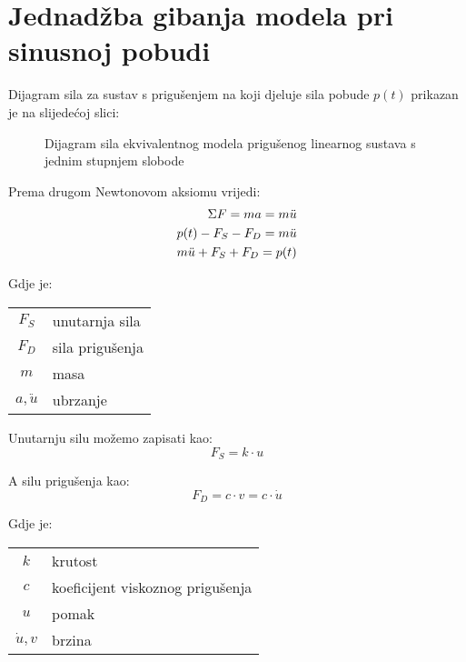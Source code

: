 \section{Jednadžba gibanja modela pri sinusnoj pobudi}
Dijagram sila za sustav s prigušenjem na koji djeluje sila pobude $p(t)$ prikazan je
na slijedećoj slici:

\begin{figure}[H]
    
    \label{fig:sile-priguseni-ekvivalentni-sustav-sdf}
    \caption{Dijagram sila ekvivalentnog modela prigušenog linearnog sustava s jednim stupnjem slobode}
\end{figure}

Prema drugom Newtonovom aksiomu vrijedi:
\begin{align}
    \Sigma F = ma = m\ddot{u}\notag\\
        p(t) - F_S - F_D = m\ddot{u} \notag\\
        m\ddot{u} + F_S + F_D = p(t) \label{eq:newton}
\end{align}

Gdje je:\\
\begin{table}[H]
\begin{tabular}{c l}
	$F_S$ & unutarnja sila \\
	$F_D$ & sila prigušenja \\
	$m$   & masa \\
        $a,\ddot{u}$   & ubrzanje\\
\end{tabular}
\end{table}

Unutarnju silu možemo zapisati kao:
\begin{equation}
	F_S = k \cdot u \label{eq:hooke}
\end{equation}

A silu prigušenja kao:
\begin{equation}
	F_D = c \cdot v = c \cdot \dot{u} \label{eq:prigusenje}
\end{equation}

Gdje je:\\
\begin{table}[H]
\begin{tabular}{c l}
	$k$ & krutost \\
	$c$ & koeficijent viskoznog prigušenja \\
	$u$ & pomak \\
	$\dot{u},v$ & brzina \\
\end{tabular}
\end{table}

